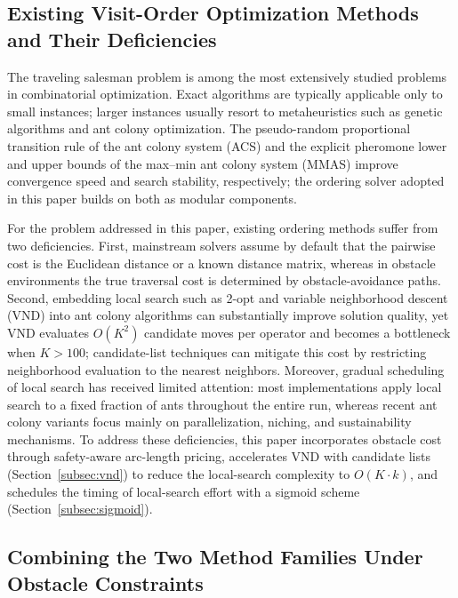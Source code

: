 \subsection{Existing Visit-Order Optimization Methods and Their Deficiencies}

The traveling salesman problem is among the most extensively studied problems in combinatorial optimization\textcolor{blue}{\cite{ref4,ref36}}. Exact algorithms are typically applicable only to small instances; larger instances usually resort to metaheuristics such as genetic algorithms\textcolor{blue}{\cite{ref19}} and ant colony optimization\textcolor{blue}{\cite{ref21,ref42}}. The pseudo-random proportional transition rule of the ant colony system (ACS)\textcolor{blue}{\cite{ref22}} and the explicit pheromone lower and upper bounds of the max--min ant colony system (MMAS)\textcolor{blue}{\cite{ref23}} improve convergence speed and search stability, respectively; the ordering solver adopted in this paper builds on both as modular components.

For the problem addressed in this paper, existing ordering methods suffer from two deficiencies. First, mainstream solvers assume by default that the pairwise cost is the Euclidean distance or a known distance matrix, whereas in obstacle environments the true traversal cost is determined by obstacle-avoidance paths. Second, embedding local search such as 2-opt and variable neighborhood descent (VND) into ant colony algorithms can substantially improve solution quality\textcolor{blue}{\cite{ref24,ref25,ref43}}, yet VND evaluates $O(K^2)$ candidate moves per operator and becomes a bottleneck when $K > 100$; candidate-list techniques can mitigate this cost by restricting neighborhood evaluation to the nearest neighbors\textcolor{blue}{\cite{ref26}}. Moreover, gradual scheduling of local search has received limited attention: most implementations apply local search to a fixed fraction of ants throughout the entire run, whereas recent ant colony variants focus mainly on parallelization, niching, and sustainability mechanisms\textcolor{blue}{\cite{ref27,ref28,ref29,ref30}}. To address these deficiencies, this paper incorporates obstacle cost through safety-aware arc-length pricing, accelerates VND with candidate lists (Section~\textcolor{blue}{\ref{subsec:vnd}}) to reduce the local-search complexity to $O(K \cdot k)$, and schedules the timing of local-search effort with a sigmoid scheme (Section~\textcolor{blue}{\ref{subsec:sigmoid}}).

\subsection{Combining the Two Method Families Under Obstacle Constraints}

